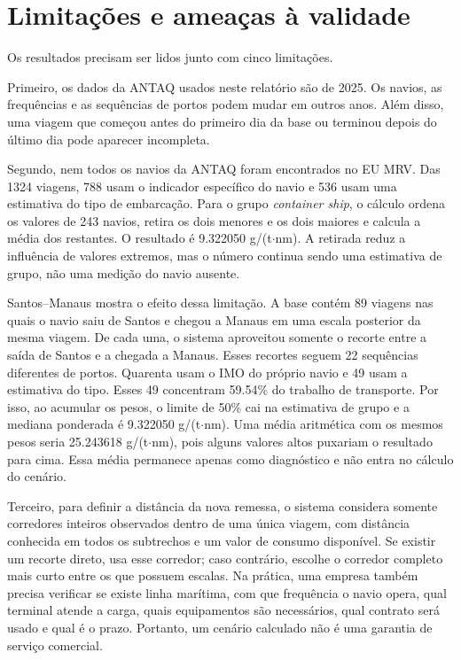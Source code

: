 \documentclass[12pt,a4paper]{report}
\begin{document}
\chapter{Limitações e ameaças à validade}
\label{chap:limitacoes}

Os resultados precisam ser lidos junto com cinco limitações.

Primeiro, os dados da ANTAQ usados neste relatório são de 2025. Os navios, as frequências e as sequências de portos podem mudar em outros anos. Além disso, uma viagem que começou antes do primeiro dia da base ou terminou depois do último dia pode aparecer incompleta.

Segundo, nem todos os navios da ANTAQ foram encontrados no EU MRV. Das \num{1324} viagens, \num{788} usam o indicador específico do navio e \num{536} usam uma estimativa do tipo de embarcação. Para o grupo \emph{container ship}, o cálculo ordena os valores de \num{243} navios, retira os dois menores e os dois maiores e calcula a média dos restantes. O resultado é \num{9.322050} g/(t$\cdot$nm). A retirada reduz a influência de valores extremos, mas o número continua sendo uma estimativa de grupo, não uma medição do navio ausente.

Santos--Manaus mostra o efeito dessa limitação. A base contém \num{89} viagens nas quais o navio saiu de Santos e chegou a Manaus em uma escala posterior da mesma viagem. De cada uma, o sistema aproveitou somente o recorte entre a saída de Santos e a chegada a Manaus. Esses recortes seguem \num{22} sequências diferentes de portos. Quarenta usam o IMO do próprio navio e 49 usam a estimativa do tipo. Esses 49 concentram \num{59.54}\% do trabalho de transporte. Por isso, ao acumular os pesos, o limite de 50\% cai na estimativa de grupo e a mediana ponderada é \num{9.322050} g/(t$\cdot$nm). Uma média aritmética com os mesmos pesos seria \num{25.243618} g/(t$\cdot$nm), pois alguns valores altos puxariam o resultado para cima. Essa média permanece apenas como diagnóstico e não entra no cálculo do cenário.

Terceiro, para definir a distância da nova remessa, o sistema considera somente corredores inteiros observados dentro de uma única viagem, com distância conhecida em todos os subtrechos e um valor de consumo disponível. Se existir um recorte direto, usa esse corredor; caso contrário, escolhe o corredor completo mais curto entre os que possuem escalas. Na prática, uma empresa também precisa verificar se existe linha marítima, com que frequência o navio opera, qual terminal atende a carga, quais equipamentos são necessários, qual contrato será usado e qual é o prazo. Portanto, um cenário calculado não é uma garantia de serviço comercial.
\end{document}
